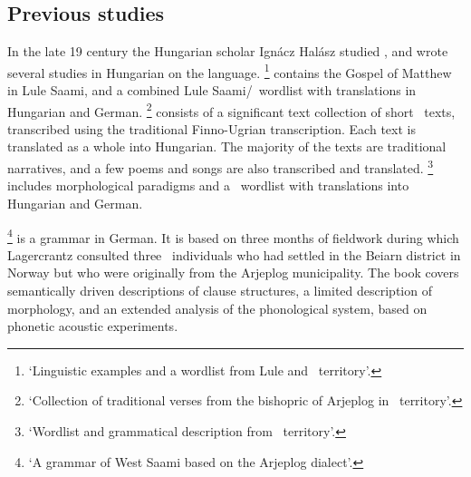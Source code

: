 \subsection{Previous studies}\label{previousWork}
%
In the late 19 century the Hungarian scholar Ignácz Halász studied \PS, and wrote several studies in Hungarian on the language. 
\footnote{‘Linguistic examples and a wordlist from Lule and \PS\ territory’.} \citep{Halasz1885} contains the Gospel of Matthew in Lule Saami, and a combined Lule Saami/\PS\ wordlist with translations in Hungarian and German. 
\footnote{‘Collection of traditional verses from the bishopric of Arjeplog in \PS\ territory’.} \citep{Halasz1893} 
consists of a significant text collection of short \PS\ texts, transcribed using the traditional Finno-Ugrian transcription. Each text is translated as a whole into Hungarian. The majority of the texts are traditional narratives, %
and a few poems and songs are also transcribed and translated. 
\footnote{‘Wordlist and grammatical description from \PS\ territory’.} \citep{Halasz1896} 
includes morphological paradigms and a \PS\ wordlist with translations into Hungarian and German. 

\footnote{‘A grammar of West Saami based on the Arjeplog dialect’.} \citep{Lagercrantz1926} 
is a grammar in German. It is based on three months of fieldwork during which Lagercrantz consulted three \PS\ individuals who had settled in the Beiarn district in Norway but who were originally from the Arjeplog municipality. The book covers semantically driven descriptions of clause structures, a limited description of morphology, and an extended analysis of the phonological system, based on phonetic acoustic experiments. 

